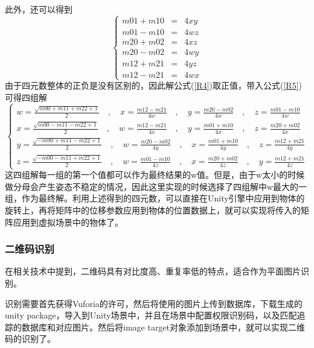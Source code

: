 此外，还可以得到
\begin{equation}\label{R5}
\left\{
\begin{aligned}
m01 + m10 &=& 4xy  \\
m01 - m10 &=& 4wz  \\
m20 + m02 &=& 4xz  \\
m20 - m02 &=& 4wy  \\
m12 + m21 &=& 4yz  \\
m12 - m21 &=& 4wx  
\end{aligned}
\right.
\end{equation}
由于四元数整体的正负是没有区别的，因此解公式(\ref{R4})取正值，带入公式(\ref{R5})可得四组解
\begin{equation}\label{R6}
\left\{
\begin{aligned}
w=\frac{\sqrt{m00 + m11 + m22 + 1}}{2} \quad\mathrm{,}\quad x = \frac{m12 - m21}{4w} \quad\mathrm{,}\quad y = \frac{m20 - m02}{4w} \quad\mathrm{,}\quad z = \frac{m01 - m10}{4w}\\
x=\frac{\sqrt{m00 - m11 - m22 + 1}}{2} \quad\mathrm{,}\quad w = \frac{m12 - m21}{4x} \quad\mathrm{,}\quad y = \frac{m01 + m10}{4x} \quad\mathrm{,}\quad z = \frac{m20 + m02}{4x}\\
y=\frac{\sqrt{-m00 + m11 - m22 + 1}}{2} \quad\mathrm{,}\quad w = \frac{m20 - m02}{4y} \quad\mathrm{,}\quad x = \frac{m01 + m10}{4y} \quad\mathrm{,}\quad z = \frac{m12 + m21}{4y}\\
z=\frac{\sqrt{-m00 - m11 + m22 + 1}}{2} \quad\mathrm{,}\quad w = \frac{m01 - m10}{4z} \quad\mathrm{,}\quad x = \frac{m20 + m02}{4z} \quad\mathrm{,}\quad y = \frac{m12 + m21}{4z}
\end{aligned}
\right.
\end{equation}
这四组解每一组的第一个值都可以作为最终结果的w值。但是，由于w太小的时候做分母会产生姿态不稳定的情况\cite{akenine2018real}，因此这里实现的时候选择了四组解中w最大的一组，作为最终解。利用上述得到的四元数，可以直接在Unity引擎中应用到物体的旋转上，再将矩阵中的位移参数应用到物体的位置数据上，就可以实现将传入的矩阵应用到虚拟场景中的物体了。

\subsubsection{二维码识别}
在相关技术中提到，二维码具有对比度高、重复率低的特点，适合作为平面图片识别。

识别需要首先获得Vuforia的许可，然后将使用的图片上传到数据库，下载生成的unity package，导入到Unity场景中，并且在场景中配置权限识别码，以及匹配追踪的数据库和对应图片。然后将image target对象添加到场景中，就可以实现二维码的识别了。

